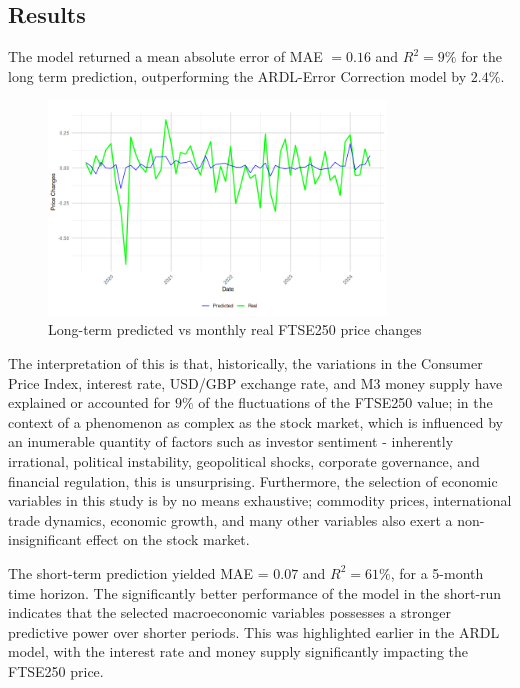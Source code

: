 \documentclass[11pt,a4paper]{article}
\begin{document}
\subsection{Results}

The model returned a mean absolute error of MAE $=0.16$ and 
$R^2 = 9\%$ for the long term prediction, outperforming the ARDL-Error Correction model by 
$2.4\%$.


\begin{figure}[h]
    \centering
    \includegraphics[width=0.8\textwidth]{long-term-monthly.png}
    \caption{Long-term predicted vs monthly real FTSE250 price changes}
    \label{fig:lmonthly}
\end{figure}

The interpretation of this is that, historically, the variations in the 
Consumer Price Index, interest rate, USD/GBP exchange rate, and M3 money 
supply have explained or accounted for $9\%$ of the fluctuations of the
FTSE250 value; in the context of a phenomenon as complex as the stock market,
which is influenced by an inumerable quantity of factors such as investor sentiment
- inherently irrational, 
political instability, geopolitical shocks, corporate governance, and financial regulation, this is 
unsurprising. Furthermore, the selection of economic variables in this study
is by no means exhaustive; commodity prices, international trade dynamics,
economic growth, and many other variables also exert a non-insignificant 
effect on the stock market.


The short-term prediction yielded MAE = $0.07$ and 
$R^2 = 61\%$, for a 5-month time horizon.
The significantly better performance of the model in the short-run
indicates that the selected macroeconomic variables possesses
a stronger predictive power over shorter periods. This was highlighted 
earlier in the ARDL model, with the interest rate and money supply significantly
impacting the FTSE250 price. 
\end{document}

